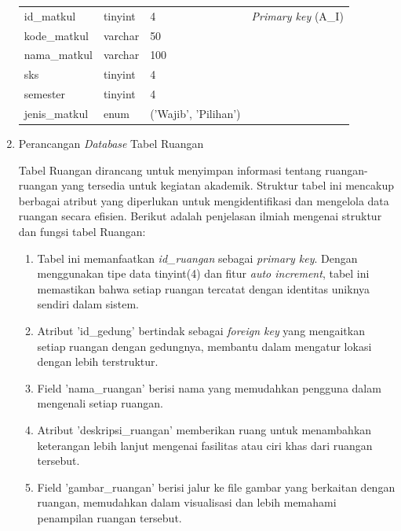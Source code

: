 \begin{enumerate}
{\begin{longtable}{l l l l}
				      id\_matkul              & tinyint                & 4                        & \textit{Primary key} (A\_I) \\
				      kode\_matkul            & varchar                & 50                       &                             \\
				      nama\_matkul            & varchar                & 100                      &                             \\
				      sks                     & tinyint                & 4                        &                             \\
				      semester                & tinyint                & 4                        &                             \\
				      jenis\_matkul           & enum                   & ('Wajib', 'Pilihan')     &                             \\
				      \hline
			      \end{longtable}
		      }

	\item Perancangan \textit{Database} Tabel Ruangan

	      Tabel Ruangan dirancang untuk menyimpan informasi tentang ruangan-ruangan yang tersedia untuk kegiatan akademik. Struktur tabel ini mencakup berbagai atribut yang diperlukan untuk mengidentifikasi dan mengelola data ruangan secara efisien. Berikut adalah penjelasan ilmiah mengenai struktur dan fungsi tabel Ruangan:

	      \begin{enumerate}[label=\alph*.]
		      \item Tabel ini memanfaatkan \textit{id\_ruangan} sebagai \textit{primary key}. Dengan menggunakan tipe data tinyint(4) dan fitur \textit{auto increment}, tabel ini memastikan bahwa setiap ruangan tercatat dengan identitas uniknya sendiri dalam sistem.
		      \item Atribut 'id\_gedung' bertindak sebagai \textit{foreign key} yang mengaitkan setiap ruangan dengan gedungnya, membantu dalam mengatur lokasi dengan lebih terstruktur.
		      \item Field 'nama\_ruangan' berisi nama yang memudahkan pengguna dalam mengenali setiap ruangan.
		      \item Atribut 'deskripsi\_ruangan' memberikan ruang untuk menambahkan keterangan lebih lanjut mengenai fasilitas atau ciri khas dari ruangan tersebut.
		      \item Field 'gambar\_ruangan' berisi jalur ke file gambar yang berkaitan dengan ruangan, memudahkan dalam visualisasi dan lebih memahami penampilan ruangan tersebut.
	      \end{enumerate}


\end{enumerate}
